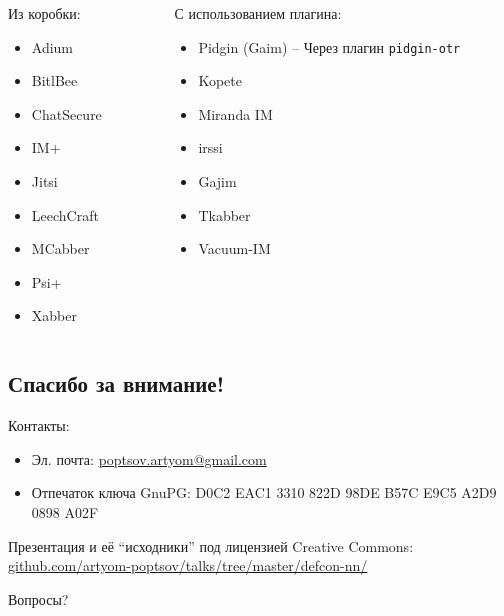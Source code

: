 \documentclass[presentation]{beamer}
\begin{document}
\begin{frame}{}
  \begin{columns}
    \begin{column}{0.5\textwidth}
      Из коробки:
      \begin{itemize}
      \item Adium
      \item BitlBee
      \item ChatSecure
      \item IM+
      \item Jitsi
      \item LeechCraft
      \item MCabber
      \item Psi+
      \item Xabber
      \end{itemize}
    \end{column}
    \begin{column}{0.5\textwidth}
      С использованием плагина:
      \begin{itemize}
      \item Pidgin (Gaim) -- Через плагин \texttt{pidgin-otr}
      \item Kopete
      \item Miranda IM
      \item irssi
      \item Gajim
      \item Tkabber
      \item Vacuum-IM
      \end{itemize}
    \end{column}
  \end{columns}
\end{frame}



\subsection{Спасибо за внимание!}

\begin{frame}{}
  \large

  Контакты:
  \begin{itemize}
  \item Эл. почта: \url{poptsov.artyom@gmail.com}
  \item Отпечаток ключа GnuPG: D0C2 EAC1 3310 822D 98DE  B57C E9C5 A2D9 0898 A02F
  \end{itemize}
  \medskip

  Презентация и её ``исходники'' под лицензией Creative Commons:
  \url{github.com/artyom-poptsov/talks/tree/master/defcon-nn/} \\[10pt]

  \bigskip

  \huge Вопросы?
\end{frame}
\end{document}
